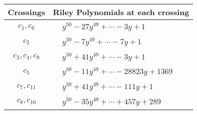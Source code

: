 \documentclass[1p]{elsarticle_modified}
\theoremstyle{definition}
\begin{document}
\begin{tabular}{m{50pt}|m{274pt}}
Crossings & \hspace{64pt}Riley Polynomials at each crossing \\
\hline $$\begin{aligned}c_{1},c_{6}\end{aligned}$$&$\begin{aligned}
&y^{50}-27 y^{49}+\cdots-3 y+1
\end{aligned}$\\
\hline $$\begin{aligned}c_{2}\end{aligned}$$&$\begin{aligned}
&y^{50}-7 y^{49}+\cdots-7 y+1
\end{aligned}$\\
\hline $$\begin{aligned}c_{3},c_{4},c_{9}\end{aligned}$$&$\begin{aligned}
&y^{50}+41 y^{49}+\cdots-3 y+1
\end{aligned}$\\
\hline $$\begin{aligned}c_{5}\end{aligned}$$&$\begin{aligned}
&y^{50}-11 y^{49}+\cdots-28823 y+1369
\end{aligned}$\\
\hline $$\begin{aligned}c_{7},c_{11}\end{aligned}$$&$\begin{aligned}
&y^{50}+41 y^{49}+\cdots-111 y+1
\end{aligned}$\\
\hline $$\begin{aligned}c_{8},c_{10}\end{aligned}$$&$\begin{aligned}
&y^{50}-35 y^{49}+\cdots+457 y+289
\end{aligned}$\\
\hline
\end{tabular}
\vskip 2pc
\end{document}
